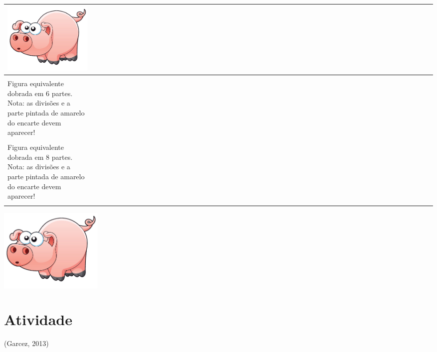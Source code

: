 \documentclass[a4,12pt]{book}
\begin{document}
\begin{center}
\begin{tabulary}{0.8\textwidth}{*{50}{L}}
     \includegraphics[width=120pt, keepaspectratio]{pig}                                                                              &                                     &                                  &                                                   \\
    \hline \\
     Figura equivalente dobrada em 6 partes. Nota: as divisões e a parte pintada de amarelo do encarte devem aparecer!  &                                     &                                  &                                                   \\
    \hline \\
     Figura equivalente dobrada em 8 partes. Nota: as divisões e a parte pintada de amarelo do encarte devem aparecer!  &                                     &                                  &                                                   \\
    \hline \\
  \end{tabulary}
\end{center}





\includegraphics[width=\textwidth,height=4cm, keepaspectratio]{pig}
\section{Atividade}







(Garcez, 2013)
\end{document}
